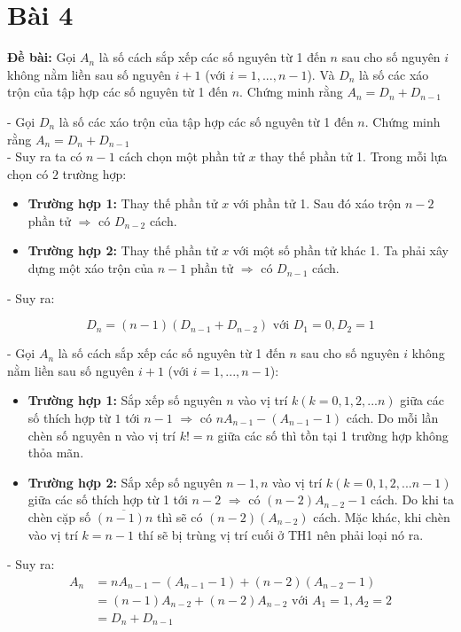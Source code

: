 \documentclass[12pt]{article}
\begin{document}
\begin{sloppypar}
\section{Bài 4}
\begin{tcolorbox}
    \textbf{Đề bài:}  Gọi \(A_{n}\) là số cách sắp xếp các số nguyên từ 1 đến \(n\) sau cho số nguyên \(i\) không nằm liền sau số nguyên \(i+1\) 
    (với \(i=1,...,n-1\)). Và \(D_{n}\) là số các xáo trộn của tập hợp các số nguyên từ 1 đến \(n\). Chứng minh rằng \(A_{n}= D_{n} + D_{n-1}\)
\end{tcolorbox}

- Gọi \(D_{n}\) là số các xáo trộn của tập hợp các số nguyên từ 1 đến \(n\). Chứng minh rằng \(A_{n}= D_{n} + D_{n-1}\) \\
- Suy ra ta có \(n-1\) cách chọn một phần tử \(x\) thay thế phần tử 1. Trong mỗi lựa chọn có \(2\) trường hợp:

\begin{itemize}
    \item \textbf{Trường hợp 1:} Thay thế phần tử \(x\) với phần tử 1. Sau đó xáo trộn \(n-2\) phần tử \(\Rightarrow\) có \(D_{n-2}\) cách. 
    \item \textbf{Trường hợp 2:} Thay thế phần tử \(x\) với một số phần tử khác 1. Ta phải xây dựng một xáo trộn của \(n-1\) phần tử \(\Rightarrow\) có \(D_{n-1}\) cách.
\end{itemize}
- Suy ra:

\begin{equation*}
    D_{n} = (n-1)(D_{n-1} + D_{n-2}) \text{ với } D_{1} = 0, D_{2} = 1
\end{equation*}

- Gọi \(A_{n}\) là số cách sắp xếp các số nguyên từ 1 đến \(n\) sau cho số nguyên \(i\) không nằm liền sau số nguyên \(i+1\) 
(với \(i=1,...,n-1\)): \\

\begin{itemize}
    \item \textbf{Trường hợp 1:} Sắp xếp số nguyên \(n\) vào vị trí \(k (k = 0,1,2,...n)\) giữa các số thích hợp từ \(1\) tới \(n-1\) \(\Rightarrow\) có \(nA_{n-1}-(A_{n-1}-1)\) cách. Do mỗi lần chèn số nguyên n vào vị trí \(k!=n\) giữa các số thì tồn tại 1 trường hợp không thỏa mãn.
    \item \textbf{Trường hợp 2:} Sắp xếp số nguyên \(n-1,n\) vào vị trí \(k(k=0,1,2,...n-1)\) giữa các số thích hợp từ 1 tới \(n-2\) \(\Rightarrow\) có \((n-2)A_{n-2}-1\) cách. Do khi ta chèn cặp số \(\overline{(n-1)n}\) thì sẽ có \((n-2)(A_{n-2})\) cách. Mặc khác, khi chèn vào vị trí \(k=n-1\) thí sẽ bị trùng vị trí cuối ở TH1 nên phải loại nó ra.
\end{itemize}
- Suy ra:
\begin{align*}
    A_{n}   & = nA_{n-1} - (A_{n-1} - 1) + (n-2)(A_{n-2}-1) \\
            & = (n-1)A_{n-2} + (n-2)A_{n-2} \text{ với } A_{1} = 1, A_{2} = 2 \\
            & = D_{n} + D_{n-1}
\end{align*}



\end{sloppypar}
\end{document}

